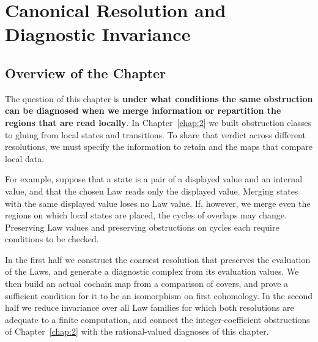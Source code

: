 \chapter{Canonical Resolution and Diagnostic Invariance}\label{chap:3}

\section*{Overview of the Chapter}

The question of this chapter is \textbf{under what conditions the same obstruction can be
diagnosed when we merge information or repartition the regions that are read locally}.
In Chapter~\ref{chap:2} we built obstruction classes to gluing from local states and
transitions. To share that verdict across different resolutions, we must specify the
information to retain and the maps that compare local data.

For example, suppose that a state is a pair of a displayed value and an internal value,
and that the chosen Law reads only the displayed value. Merging states with the same
displayed value loses no Law value. If, however, we merge even the regions on which
local states are placed, the cycles of overlaps may change. Preserving Law values and
preserving obstructions on cycles each require conditions to be checked.

In the first half we construct the coarsest resolution that preserves the evaluation of
the Laws, and generate a diagnostic complex from its evaluation values. We then build an
actual cochain map from a comparison of covers, and prove a sufficient condition for it
to be an isomorphism on first cohomology. In the second half we reduce invariance over
all Law families for which both resolutions are adequate to a finite computation, and
connect the integer-coefficient obstructions of Chapter~\ref{chap:2} with the
rational-valued diagnoses of this chapter.

